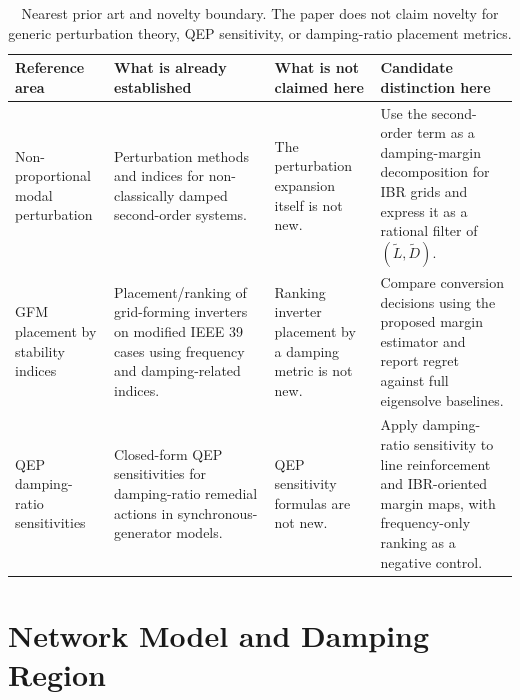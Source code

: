 \documentclass[journal]{IEEEtran}
\newcommand{\Lt}{\widetilde L}
\newcommand{\Dt}{\widetilde D}
\begin{document}
\begin{table}[t]
\centering
\caption{Nearest prior art and novelty boundary. The paper does not claim novelty for generic perturbation theory, QEP sensitivity, or damping-ratio placement metrics.}
\label{tab:priorart}
\scriptsize
\begin{tabular}{@{}p{}p{}p{}p{}@{}}
\toprule
Reference area & What is already established & What is not claimed here & Candidate distinction here\\
\midrule
Non-proportional modal perturbation \cite{pan2020modal,conde2021nonproportionality}
& Perturbation methods and indices for non-classically damped second-order systems.
& The perturbation expansion itself is not new.
& Use the second-order term as a damping-margin decomposition for IBR grids and express it as a rational filter of $(\Lt,\Dt)$.\\
GFM placement by stability indices \cite{liyanage2025gfmi}
& Placement/ranking of grid-forming inverters on modified IEEE 39 cases using frequency and damping-related indices.
& Ranking inverter placement by a damping metric is not new.
& Compare conversion decisions using the proposed margin estimator and report regret against full eigensolve baselines.\\
QEP damping-ratio sensitivities \cite{setareh2025damping}
& Closed-form QEP sensitivities for damping-ratio remedial actions in synchronous-generator models.
& QEP sensitivity formulas are not new.
& Apply damping-ratio sensitivity to line reinforcement and IBR-oriented margin maps, with frequency-only ranking as a negative control.\\
\bottomrule
\end{tabular}
\end{table}

\section{Network Model and Damping Region}
\end{document}
